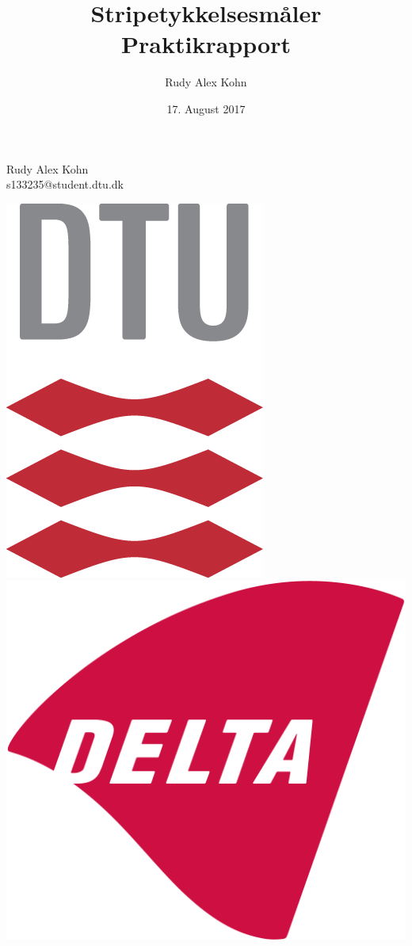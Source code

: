 \documentclass[11pt,a4paper,danish]{article}
\title{Stripetykkelsesmåler\\Praktikrapport}
\author{Rudy Alex Kohn}
\date{17. August 2017}
\begin{document}
	
	\maketitle
	\renewcommand{\contentsname}{Indeks}
	\renewcommand{\listfigurename}{Figurliste}
	\renewcommand{\figurename}{Figur}
	\renewcommand\refname{Referencer}
	
	\begin{center}
		Rudy Alex Kohn\\
		s133235@student.dtu.dk
	\end{center}
	
	\vspace{25mm}
	
	\begin{center}
		\includegraphics[scale=0.3]{Billeder/kunlogo.png}
		\includegraphics[scale=0.15]{Billeder/DELTA_1024px.png}
	\end{center}
	
\end{document}
